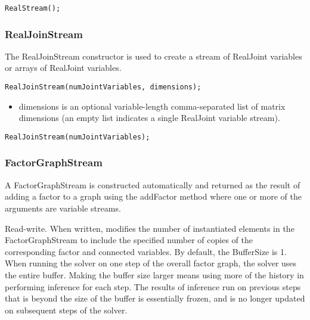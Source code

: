 \ifjava
\begin{lstlisting}
RealStream();
\end{lstlisting}
\fi

\subsubsection{RealJoinStream}


The RealJoinStream constructor is used to create a stream of RealJoint variables or arrays of RealJoint variables.

\ifmatlab
\begin{lstlisting}
RealJoinStream(numJointVariables, dimensions);
\end{lstlisting}

\begin{itemize}
\item dimensions is an optional variable-length comma-separated list of matrix dimensions (an empty list indicates a single RealJoint variable stream).
\end{itemize}
\fi

\ifjava
\begin{lstlisting}
RealJoinStream(numJointVariables);
\end{lstlisting}
\fi


\subsubsection{FactorGraphStream}

A FactorGraphStream is constructed automatically and returned as the result of adding a factor to a graph using the addFactor method where one or more of the arguments are variable streams.


\label{sec:FactorGraphStream.BufferSize}

Read-write. When written, modifies the number of instantiated elements in the FactorGraphStream to include the specified number of copies of the corresponding factor and connected variables.  By default, the BufferSize is 1.  When running the solver on one step of the overall factor graph, the solver uses the entire buffer.  Making the buffer size larger means using more of the history in performing inference for each step.  The results of inference run on previous steps that is beyond the size of the buffer is essentially frozen, and is no longer updated on subsequent steps of the solver.


